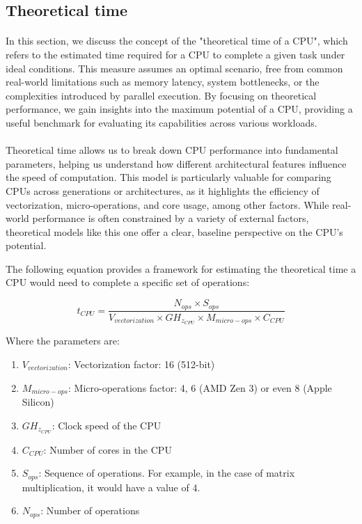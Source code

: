 \subsection{Theoretical time}

    \paragraph*{}
    In this section, we discuss the concept of the "theoretical time of a CPU", which refers to the 
    estimated time required for a CPU to complete a given task under ideal conditions. This measure 
    assumes an optimal scenario, free from common real-world limitations such as memory latency, 
    system bottlenecks, or the complexities introduced by parallel execution. By focusing on theoretical 
    performance, we gain insights into the maximum potential of a CPU, providing a useful benchmark 
    for evaluating its capabilities across various workloads.
    \par

    \paragraph*{}
    Theoretical time allows us to break down CPU performance into fundamental parameters, helping us 
    understand how different architectural features influence the speed of computation. This model is 
    particularly valuable for comparing CPUs across generations or architectures, as it highlights 
    the efficiency of vectorization, micro-operations, and core usage, among other factors. While 
    real-world performance is often constrained by a variety of external factors, theoretical models 
    like this one offer a clear, baseline perspective on the CPU's potential.
    \par

    The following equation provides a framework for estimating the theoretical time a CPU would need 
    to complete a specific set of operations:

    \begin{equation}
        t_{CPU}=\frac{N_{ops} \times S_{ops}}{V_{vectorization} \times GH_{z_{CPU}} \times M_{micro-ops} \times C_{CPU}}
        \label{eq:timetheoretical}
    \end{equation}


    Where the parameters are: 
    \begin{enumerate}
        \item \(V_{vectorization}\): Vectorization factor: 16 (512-bit)
        \item \(M_{micro-ops}\): Micro-operations factor: 4, 6 (AMD Zen 3) or even 8 (Apple Silicon)
        \item \(GH_{z_{CPU}}\): Clock speed of the CPU
        \item \(C_{CPU}\): Number of cores in the CPU
        \item \(S_{ops}\): Sequence of operations. For example, in the case of matrix multiplication, it would have a value of 4.
        \item \(N_{ops}\): Number of operations
    \end{enumerate}

\newpage